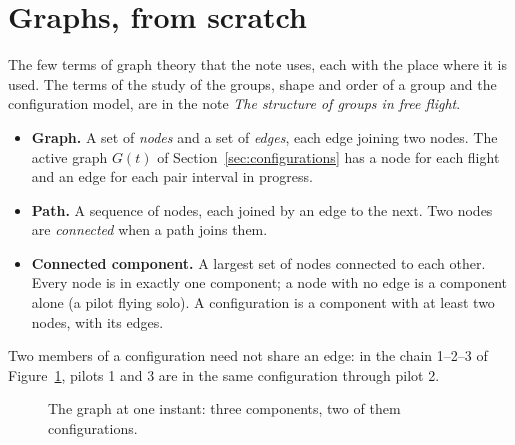 \section{Graphs, from scratch}\label{app:graphs}

The few terms of graph theory that the note uses, each with the place where it is used. The terms
of the study of the groups, shape and order of a group and the configuration model, are in
the note \emph{The structure of groups in free flight}.

\begin{itemize}
  \item \textbf{Graph.} A set of \emph{nodes} and a set of \emph{edges}, each edge joining two
        nodes. The active graph $G(t)$ of Section~\ref{sec:configurations} has a node for each flight
        and an edge for each pair interval in progress.
  \item \textbf{Path.} A sequence of nodes, each joined by an edge to the next. Two nodes are
        \emph{connected} when a path joins them.
  \item \textbf{Connected component.} A largest set of nodes connected to each other. Every node is
        in exactly one component; a node with no edge is a component alone (a pilot flying solo).
        A configuration is a component with at least two nodes, with its edges.
\end{itemize}

Two members of a configuration need not share an edge: in the chain 1--2--3 of
Figure~\ref{fig:graph}, pilots 1 and 3 are in the same configuration through pilot 2.

\begin{figure}
\centering
{}
\caption{The graph at one instant: three components, two of them configurations.}
\label{fig:graph}
\end{figure}

